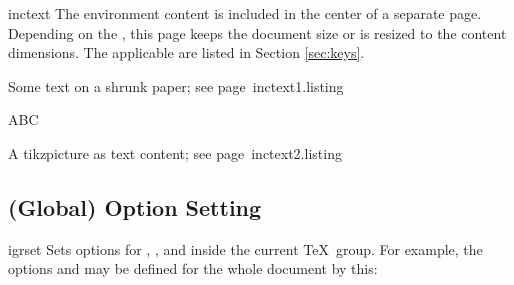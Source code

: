 \documentclass[a4paper,11pt]{ltxdoc}
\begin{document}
\begin{docEnvironment}{inctext}{}
  The environment content is included in the center
  of a separate page. Depending on the , this page keeps the
  document size or is resized to the content dimensions.
  The applicable  are listed in Section \ref{sec:keys}.


\begin{texexptitled}%
  {Some text on a shrunk paper; see page~\pageref{inctext1}}{inctext1.listing}
\begin{inctext}[paper=graphics,label={inctext1},bookmark={A huge ABC}]
  \Huge ABC
\end{inctext}
\end{texexptitled}


\begin{texexptitled}%
  {A tikzpicture as text content; see page~\pageref{inctext2}}{inctext2.listing}
\begin{inctext}[paper=a6,landscape,label={inctext2},bookmark={Graph},
    overlay page number at bottom=8mm]
\end{inctext}
\end{texexptitled}
\end{docEnvironment}


\subsection{(Global) Option Setting}

\begin{docCommand}{igrset}{}
  Sets options for , , and
   inside the current \TeX\ group.
  For example, the options  and
   may be defined for the whole document by this:
\begin{dispListing}
\end{dispListing}
\end{docCommand}
\end{document}
